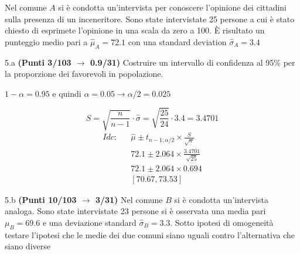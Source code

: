 \documentclass[
  11pt,
]{book}
\theoremstyle{mytheoremstyle}
\theoremstyle{mydefstyle}
\newenvironment{sol}
  {
  \begin{tcolorbox}[enhanced,breakable,arc=0.1mm,boxrule=1pt,colback=white,colframe=iblue,
  title=\bf \fontfamily{lmss}\selectfont \hspace{.5 cm} Soluzione,drop fuzzy shadow]

}{
\end{tcolorbox}
  }
\begin{document}
Nel comune \(A\) si è condotta un'intervista per conoscere l'opinione
dei cittadini sulla presenza di un inceneritore. Sono state intervistate
25 persone a cui è stato chiesto di esprimete l'opinione in una scala da zero a 100.
È risultato un punteggio medio pari a \(\hat\mu_A=72.1\) con una standard deviation
\(\hat\sigma_A=3.4\)

5.a \textbf{(Punti 3/103 \(\rightarrow\) 0.9/31)} Costruire un intervallo di confidenza al 95\%
per la proporzione dei favorevoli in popolazione.

\begin{sol}
\(1-\alpha =0.95\) e quindi \(\alpha=0.05\rightarrow \alpha/2=0.025\)

\[
      S  =\sqrt{\frac {n}{n-1}}\cdot\hat\sigma =
     \sqrt{\frac { 25 }{ 24 }}\cdot 3.4 = 3.4701 
\]
\begin{eqnarray*}
  Idc: & &  \hat\mu \pm  t_{n-1;\alpha/2} \times \frac{S}{\sqrt{n}} \\
     & &  72.1 \pm  2.064 \times \frac{ 3.4701 }{\sqrt{ 25 }} \\
     & &  72.1 \pm  2.064 \times  0.694 \\
     & & [ 70.67 ,  73.53 ]
\end{eqnarray*}

\end{sol}

5.b \textbf{(Punti 10/103 \(\rightarrow\) 3/31)} Nel comune \(B\) si è condotta un'intervista analoga.
Sono state intervistate 23 persone si è osservata una media pari \(\mu_B=69.6\) e una deviazione standard \(\hat\sigma_B=3.3\).
Sotto ipotesi di omogeneità testare l'ipotesi che le medie dei due comuni siano uguali contro l'alternativa che siano diverse
\end{document}
